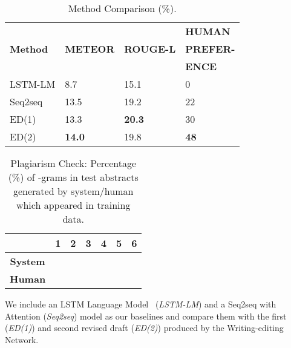 \documentclass[11pt,a4paper]{article}
\begin{document}
\begin{table}[!htb]
\footnotesize
  \begin{center}
   \begin{tabular}{|p{1.5cm}|p{1.3cm}<{\centering}|p{1.5cm}<{\centering}|p{1.5cm}<{\centering}|}
\hline
\textbf{}       & \textbf{}       & \textbf{}        & \textbf{HUMAN}   \\
\textbf{Method} & \textbf{METEOR} & \textbf{ROUGE-L} & \textbf{PREFER-} \\
\textbf{}       & \textbf{}       & \textbf{}        & \textbf{ENCE}    \\ \hline
LSTM-LM         & 8.7             & 15.1             & 0                             \\ \hline
Seq2seq         & 13.5            & 19.2             & 22                            \\ \hline
ED(1)   		& 13.3   		  & \textbf{20.3}    & 30                            \\ \hline
ED(2)   		& \textbf{14.0}   & 19.8    		 & \textbf{48}                   \\ \hline
\end{tabular}
  \end{center}
\caption{ Method Comparison (\%).}
\label{table:methodcomparison}
\end{table}
\begin{table}[!htb]
\footnotesize
\centering
    \begin{tabular}{|c|c|c|c|c|c|c|}
    \hline
         & \bf 1  & \bf 2  &\bf 3 &\bf 4  &\bf 5  & \bf 6 \\ \hline
    \bf System &  &  &  &  &  &  \\ \hline
    \bf Human  &  &  &  &  &   &  \\ \hline
\end{tabular}
\caption{Plagiarism Check: Percentage (\%) of -grams in test abstracts generated by system/human which appeared in training data.}
\label{plag_check}
\end{table}
We include an LSTM Language Model~\citep{lstmlm12} (\textit{LSTM-LM}) and a Seq2seq with Attention (\textit{Seq2seq}) model as our baselines and compare them with the first (\textit{ED(1)}) and second revised draft (\textit{ED(2)}) produced by the Writing-editing Network.
\end{document}
